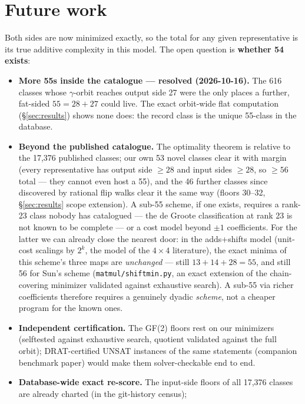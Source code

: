 \documentclass[10pt]{article}
\begin{document}
\section{Future work}\label{sec:future}

Both sides are now minimized exactly, so the total for any given
representative is its true additive complexity in this model. The open
question is \textbf{whether 54 exists}:

\begin{itemize}
\item \textbf{More 55s inside the catalogue --- resolved (2026-10-16).}
  The 616 classes whose $\gamma$-orbit reaches output side 27 were the
  only places a further, fat-sided $55 = 28 + 27$ could live.  The
  exact orbit-wide flat computation (\S\ref{sec:results}) shows none
  does: the record class is the unique 55-class in the database.
\item \textbf{Beyond the published catalogue.} The optimality theorem
  is relative to the 17{,}376 published classes; our own 53 novel
  classes clear it with margin (every representative has output side
  $\ge 28$ and input sides $\ge 28$, so $\ge 56$ total --- they
  cannot even host a 55), and the 46 further classes since discovered
  by rational flip walks clear it the same way (floors 30--32,
  \S\ref{sec:results} scope extension). A sub-55 scheme, if one exists, requires a
  rank-23 class nobody has catalogued --- the de Groote classification
  at rank 23 is not known to be complete --- or a cost model beyond
  $\pm1$ coefficients. For the latter we can already close the
  nearest door: in the adds+shifts model (unit-cost scalings by $2^k$,
  the model of the $4\times4$ literature), the exact minima of this
  scheme's three maps are \emph{unchanged} --- still $13 + 14 + 28 =
  55$, and still 56 for Sun's scheme (\texttt{matmul/shiftmin.py}, an
  exact extension of the chain-covering minimizer validated against
  exhaustive search). A sub-55 via richer coefficients therefore
  requires a genuinely dyadic \emph{scheme}, not a cheaper program
  for the known ones.
\item \textbf{Independent certification.} The GF(2) floors rest on our
  minimizers (selftested against exhaustive search, quotient validated
  against the full orbit); DRAT-certified UNSAT instances of the same
  statements (companion benchmark paper) would make them
  solver-checkable end to end.
\item \textbf{Database-wide exact re-score.} The input-side floors of
  all 17{,}376 classes are already charted (in the git-history census);

\end{itemize}
\end{document}
